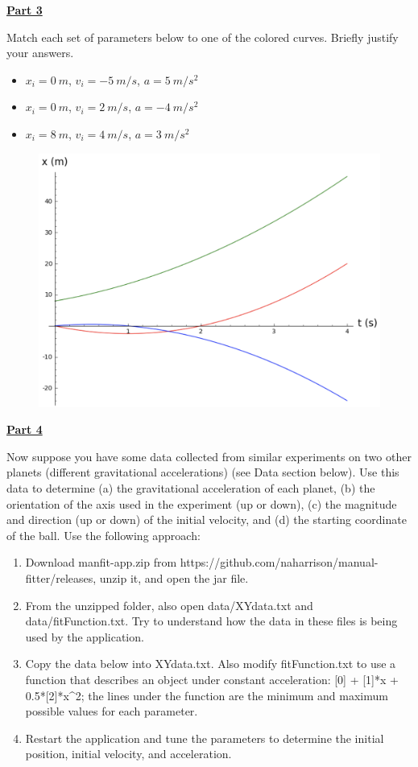 \underline{\textbf{Part 3}} \par
Match each set of parameters below to one of the colored curves.
Briefly justify your answers.
\begin{itemize}
  \item $x_i = 0 \ m$, $v_i = -5 \ m/s$, $a = 5 \ m/s^2$
  \item $x_i = 0 \ m$, $v_i = 2 \ m/s$, $a = -4 \ m/s^2$
  \item $x_i = 8 \ m$, $v_i = 4 \ m/s$, $a = 3 \ m/s^2$
\end{itemize}
\begin{figure}[H]
\includegraphics[scale=0.4]{figures/fitting1Dmotion/threeCurves.png}
\end{figure}

\underline{\textbf{Part 4}} \par
Now suppose you have some data collected from similar experiments on two other planets (different gravitational accelerations) (see Data section below).
Use this data to determine
(a) the gravitational acceleration of each planet,
(b) the orientation of the axis used in the experiment (up or down),
(c) the magnitude and direction (up or down) of the initial velocity, and
(d) the starting coordinate of the ball.
Use the following approach:
\begin{enumerate}
\item Download manfit-app.zip from https://github.com/naharrison/manual-fitter/releases, unzip it, and open the jar file.
\item From the unzipped folder, also open data/XYdata.txt and data/fitFunction.txt. Try to understand how the data in these files is being used by the application.
\item Copy the data below into XYdata.txt. Also modify fitFunction.txt to use a function that describes an object under constant acceleration: [0] + [1]*x + 0.5*[2]*x\string^2; the lines under the function are the minimum and maximum possible values for each parameter.
\item Restart the application and tune the parameters to determine the initial position, initial velocity, and acceleration.
\end{enumerate}

